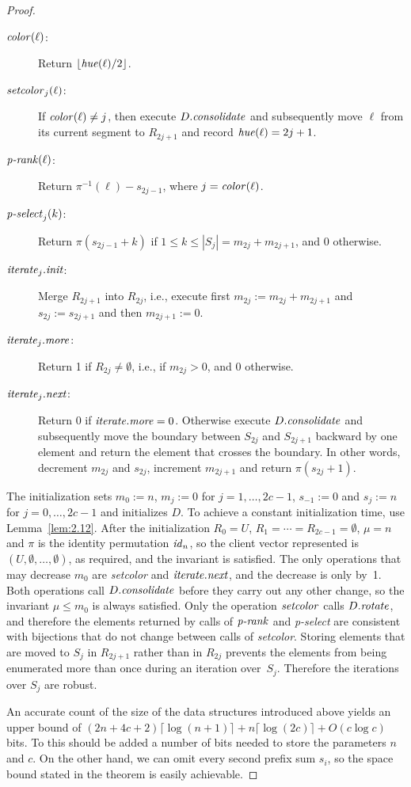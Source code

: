\documentclass[envcountsame,envcountsect,undated,nolinenumbers]{lnthi}
\def\Tvn#1{\hbox{\textit{#1\/}}}
\def\Tfloor#1{\lfloor #1\rfloor}
\def\Tceil#1{\lceil #1\rceil}
\begin{document}
\begin{proof}
\begin{description}
\item[\normalfont $\Tvn{color}(\ell)$:]
Return $\Tfloor{{{\Tvn{hue}(\ell)}/2}}$.
\item[\normalfont $\Tvn{setcolor}_j(\ell)$:]
If $\Tvn{color}(\ell)\not=j$,
then execute $D.\Tvn{consolidate}$ and subsequently move $\ell$
from its current segment to $R_{2 j+1}$
and record $\Tvn{hue}(\ell)=2 j+1$.
\item[\normalfont $\Tvn{p-rank}(\ell)$:]
Return $\pi^{-1}(\ell)-s_{2 j-1}$, where $j=\Tvn{color}(\ell)$.
\item[\normalfont $\Tvn{p-select}_j(k)$:]
Return $\pi(s_{2 j-1}+k)$ if
$1\le k\le |S_j|=m_{2 j}+m_{2 j+1}$, and 0 otherwise.
\item[\normalfont $\Tvn{iterate}_j.\Tvn{init}$:]
Merge $R_{2 j+1}$ into $R_{2 j}$, i.e.,
execute first $m_{2 j}:=m_{2 j}+m_{2 j+1}$
and $s_{2 j}:=s_{2 j+1}$ and then $m_{2 j+1}:=0$.
\item[\normalfont $\Tvn{iterate}_j.\Tvn{more}$:]
Return 1 if $R_{2 j}\not=\emptyset$, i.e., if $m_{2 j}>0$,
and 0 otherwise.
\item[\normalfont $\Tvn{iterate}_j.\Tvn{next}$:]
Return $0$ if $\Tvn{iterate}.\Tvn{more}=0$.
Otherwise execute $D.\Tvn{consolidate}$ and subsequently
move the boundary between $S_{2 j}$ and $S_{2 j+1}$ backward
by one element and return the element that crosses the boundary.
In other words, decrement $m_{2 j}$ and $s_{2 j}$, increment
$m_{2 j+1}$ and return $\pi(s_{2 j}+1)$.
\end{description}

The initialization
sets $m_0:=n$,
$m_j:=0$ for $j=1,\ldots,2 c-1$,
$s_{-1}:=0$ and $s_j:=n$ for $j=0,\ldots,2 c-1$
and initializes $D$.
To achieve a constant
initialization time, use Lemma~\ref{lem:2.12}.
After the initialization $R_0=U$,
$R_1=\cdots=R_{2 c-1}=\emptyset$,
$\mu=n$ and $\pi$ is the identity permutation $\Tvn{id}_n$,
so the client vector represented is
$(U,\emptyset,\ldots,\emptyset)$,
as required, and the invariant is satisfied.
The only operations that may decrease $m_0$
are \Tvn{setcolor} and $\Tvn{iterate}.\Tvn{next}$,
and the decrease is only by~1.
Both operations call
$D.\Tvn{consolidate}$ before they carry out any
other change, so
the invariant $\mu\le m_0$ is always satisfied.
Only the operation $\Tvn{setcolor}$
calls $D.\Tvn{rotate}$, and therefore the elements
returned by calls of $\Tvn{p-rank}$ and
\Tvn{p-select} are consistent
with bijections that do not change between
calls of \Tvn{setcolor}.
Storing elements that are moved to $S_j$
in $R_{2 j+1}$ rather than in $R_{2 j}$
prevents the elements from being enumerated
more than once during an iteration over~$S_j$.
Therefore the iterations over $S_j$ are robust.

An accurate count of the size of the data
structures introduced above yields an upper bound of
$(2 n+4 c+2)\Tceil{\log(n+1)}+n\Tceil{\log(2 c)}
 +O(c\log c)$ bits.
To this should be added a number of bits needed
to store the parameters $n$ and $c$.
On the other hand, we can omit every second
prefix sum $s_i$, so the space bound stated
in the theorem is easily achievable.
\end{proof}
\end{document}
